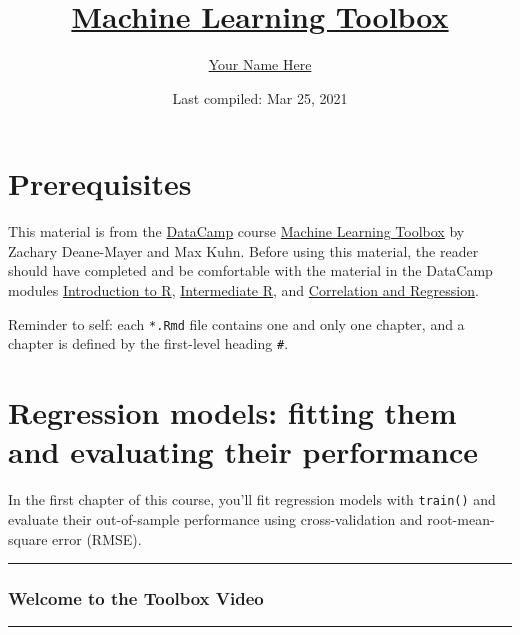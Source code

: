 \documentclass[
]{book}
\title{\href{https://www.datacamp.com/courses/machine-learning-toolbox}{Machine Learning Toolbox}}
\author{\href{https://your_github_username.github.io/}{Your Name Here}}
\date{Last compiled: Mar 25, 2021}
\begin{document}
\maketitle

{
\setcounter{tocdepth}{1}
\tableofcontents
}
\hypertarget{prerequisites}{%
\chapter{Prerequisites}\label{prerequisites}}

This material is from the \href{https://www.datacamp.com}{DataCamp} course \href{https://www.datacamp.com/courses/machine-learning-toolbox}{Machine Learning Toolbox} by Zachary Deane-Mayer and Max Kuhn. Before using this material, the reader should have completed and be comfortable with the material in the DataCamp modules \href{https://www.datacamp.com/courses/free-introduction-to-r}{Introduction to R}, \href{https://www.datacamp.com/courses/intermediate-r}{Intermediate R}, and \href{https://www.datacamp.com/courses/correlation-and-regression}{Correlation and Regression}.

Reminder to self: each \texttt{*.Rmd} file contains one and only one chapter, and a chapter is defined by the first-level heading \texttt{\#}.

\hypertarget{regression-models-fitting-them-and-evaluating-their-performance}{%
\chapter{Regression models: fitting them and evaluating their performance}\label{regression-models-fitting-them-and-evaluating-their-performance}}

In the first chapter of this course, you'll fit regression models with \texttt{train()} and evaluate their out-of-sample performance using cross-validation and root-mean-square error (RMSE).

\begin{center}\rule{0.5\linewidth}{0.5pt}\end{center}

\hypertarget{welcome-to-the-toolbox-video}{%
\subsection*{Welcome to the Toolbox Video}\label{welcome-to-the-toolbox-video}}

\begin{center}\rule{0.5\linewidth}{0.5pt}\end{center}
\end{document}
